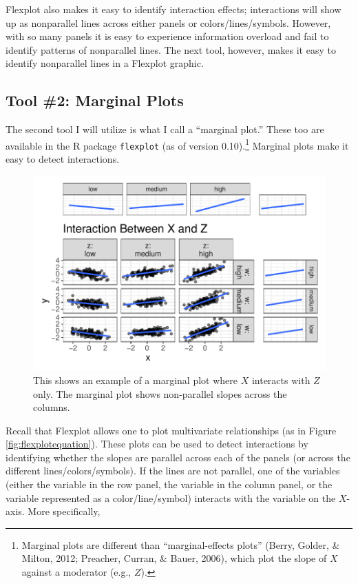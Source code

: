 \documentclass[
  man,floatsintext]{apa6}
\begin{document}
Flexplot also makes it easy to identify interaction effects; interactions will show up as nonparallel lines across either panels or colors/lines/symbols. However, with so many panels it is easy to experience information overload and fail to identify patterns of nonparallel lines. The next tool, however, makes it easy to identify nonparallel lines in a Flexplot graphic.

\subsection{Tool \#2: Marginal Plots}\label{tool-2-marginal-plots}

The second tool I will utilize is what I call a ``marginal plot.'' These too are available in the R package \texttt{flexplot} (as of version 0.10).\footnote{Marginal plots are different than ``marginal-effects plots'' (Berry, Golder, \& Milton, 2012; Preacher, Curran, \& Bauer, 2006), which plot the slope of \(X\) against a moderator (e.g., \(Z\)).} Marginal plots make it easy to detect interactions.

\begin{figure}

{\centering \includegraphics[width=0.75\linewidth]{visual_partitions_files/figure-latex/threeinteractions1-1} 

}

\caption{This shows an example of a marginal plot where $X$ interacts with $Z$ only. The marginal plot shows non-parallel slopes across the columns.}\label{fig:threeinteractions1}
\end{figure}

Recall that Flexplot allows one to plot multivariate relationships (as in Figure \ref{fig:flexplotequation}). These plots can be used to detect interactions by identifying whether the slopes are parallel across each of the panels (or across the different lines/colors/symbols). If the lines are not parallel, one of the variables (either the variable in the row panel, the variable in the column panel, or the variable represented as a color/line/symbol) interacts with the variable on the \(X\)-axis. More specifically,
\end{document}
